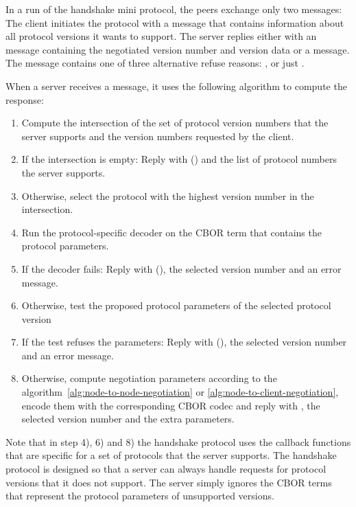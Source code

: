 In a run of the handshake mini protocol, the peers exchange only two messages:
The client initiates the protocol with a \MsgProposeVersions{} message that
contains information about all protocol versions it wants to support. The
server replies either with an \MsgAcceptVersion{} message containing the
negotiated version number and version data or a \MsgRefuse{} message.
The \MsgRefuse{} message contains one of three alternative refuse reasons:
\VersionMismatch{}, \HandshakeDecodeError{} or just \Refused{}.

When a server receives a \MsgProposeVersions{} message, it uses the following algorithm to
compute the response:
\begin{enumerate}
\item
  Compute the intersection of the set of protocol version numbers that the server supports
  and the version numbers requested by the client.
\item
  If the intersection is empty:
  Reply with \MsgRefuse(\VersionMismatch) and the list of protocol numbers the server supports.
\item
  Otherwise, select the protocol with the highest version number in the
    intersection.
\item
  Run the protocol-specific decoder on the CBOR term that contains the protocol parameters.
\item
  If the decoder fails:
  Reply with \MsgRefuse(\HandshakeDecodeError), the selected version number and an error message.
\item
  Otherwise, test the proposed protocol parameters of the selected protocol version
\item
  If the test refuses the parameters:
    Reply with \MsgRefuse(\Refused), the selected version number and an error message.
\item
  Otherwise, compute negotiation parameters according to the
    algorithm~\ref{alg:node-to-node-negotiation} or
    \ref{alg:node-to-client-negotiation}, encode them with the corresponding
    CBOR codec and reply with \MsgAcceptVersion, the selected version number
    and the extra parameters.
\end{enumerate}
Note that in step 4), 6) and 8) the handshake protocol uses the callback functions that are specific
for a set of protocols that the server supports.
The handshake protocol is designed
so that a server can always handle requests for protocol versions that it does not support.
The server simply ignores the CBOR terms that represent the protocol parameters of unsupported
versions.

